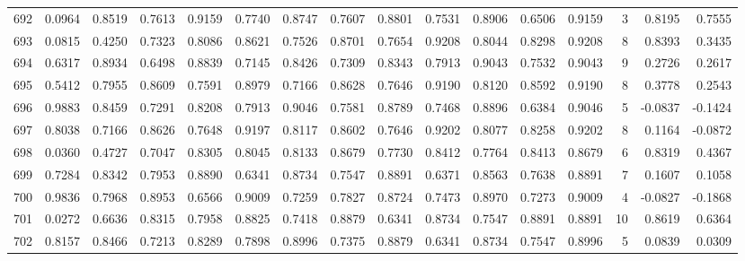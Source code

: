 \begin{tabular}{lrrrrrrrrrrrrrrr}
692 &      0.0964 &  0.8519 &  0.7613 &  0.9159 &  0.7740 &  0.8747 &  0.7607 &  0.8801 &  0.7531 &  0.8906 &   0.6506 &     0.9159 &      3 &                    0.8195 &                     0.7555 \\
693 &      0.0815 &  0.4250 &  0.7323 &  0.8086 &  0.8621 &  0.7526 &  0.8701 &  0.7654 &  0.9208 &  0.8044 &   0.8298 &     0.9208 &      8 &                    0.8393 &                     0.3435 \\
694 &      0.6317 &  0.8934 &  0.6498 &  0.8839 &  0.7145 &  0.8426 &  0.7309 &  0.8343 &  0.7913 &  0.9043 &   0.7532 &     0.9043 &      9 &                    0.2726 &                     0.2617 \\
695 &      0.5412 &  0.7955 &  0.8609 &  0.7591 &  0.8979 &  0.7166 &  0.8628 &  0.7646 &  0.9190 &  0.8120 &   0.8592 &     0.9190 &      8 &                    0.3778 &                     0.2543 \\
696 &      0.9883 &  0.8459 &  0.7291 &  0.8208 &  0.7913 &  0.9046 &  0.7581 &  0.8789 &  0.7468 &  0.8896 &   0.6384 &     0.9046 &      5 &                   -0.0837 &                    -0.1424 \\
697 &      0.8038 &  0.7166 &  0.8626 &  0.7648 &  0.9197 &  0.8117 &  0.8602 &  0.7646 &  0.9202 &  0.8077 &   0.8258 &     0.9202 &      8 &                    0.1164 &                    -0.0872 \\
698 &      0.0360 &  0.4727 &  0.7047 &  0.8305 &  0.8045 &  0.8133 &  0.8679 &  0.7730 &  0.8412 &  0.7764 &   0.8413 &     0.8679 &      6 &                    0.8319 &                     0.4367 \\
699 &      0.7284 &  0.8342 &  0.7953 &  0.8890 &  0.6341 &  0.8734 &  0.7547 &  0.8891 &  0.6371 &  0.8563 &   0.7638 &     0.8891 &      7 &                    0.1607 &                     0.1058 \\
700 &      0.9836 &  0.7968 &  0.8953 &  0.6566 &  0.9009 &  0.7259 &  0.7827 &  0.8724 &  0.7473 &  0.8970 &   0.7273 &     0.9009 &      4 &                   -0.0827 &                    -0.1868 \\
701 &      0.0272 &  0.6636 &  0.8315 &  0.7958 &  0.8825 &  0.7418 &  0.8879 &  0.6341 &  0.8734 &  0.7547 &   0.8891 &     0.8891 &     10 &                    0.8619 &                     0.6364 \\
702 &      0.8157 &  0.8466 &  0.7213 &  0.8289 &  0.7898 &  0.8996 &  0.7375 &  0.8879 &  0.6341 &  0.8734 &   0.7547 &     0.8996 &      5 &                    0.0839 &                     0.0309 \\

\end{tabular}
